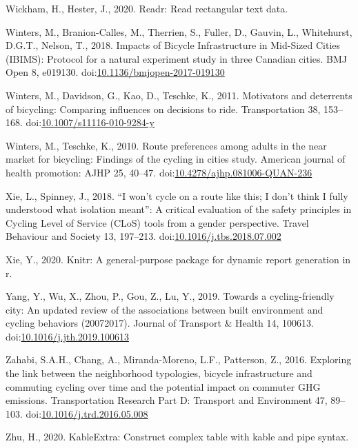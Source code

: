 \documentclass[]{elsarticle} %
\begin{document}
\leavevmode\hypertarget{ref-R-readr}{}%
Wickham, H., Hester, J., 2020. Readr: Read rectangular text data.

\leavevmode\hypertarget{ref-wintersImpactsBicycleInfrastructure2018}{}%
Winters, M., Branion-Calles, M., Therrien, S., Fuller, D., Gauvin, L.,
Whitehurst, D.G.T., Nelson, T., 2018. Impacts of Bicycle Infrastructure
in Mid-Sized Cities (IBIMS): Protocol for a natural experiment study in
three Canadian cities. BMJ Open 8, e019130.
doi:\href{https://doi.org/10.1136/bmjopen-2017-019130}{10.1136/bmjopen-2017-019130}

\leavevmode\hypertarget{ref-wintersMotivatorsDeterrentsBicycling2011}{}%
Winters, M., Davidson, G., Kao, D., Teschke, K., 2011. Motivators and
deterrents of bicycling: Comparing influences on decisions to ride.
Transportation 38, 153--168.
doi:\href{https://doi.org/10.1007/s11116-010-9284-y}{10.1007/s11116-010-9284-y}

\leavevmode\hypertarget{ref-wintersRoutePreferencesAdults2010}{}%
Winters, M., Teschke, K., 2010. Route preferences among adults in the
near market for bicycling: Findings of the cycling in cities study.
American journal of health promotion: AJHP 25, 40--47.
doi:\href{https://doi.org/10.4278/ajhp.081006-QUAN-236}{10.4278/ajhp.081006-QUAN-236}

\leavevmode\hypertarget{ref-xieWonCycleRoute2018}{}%
Xie, L., Spinney, J., 2018. ``I won't cycle on a route like this; I
don't think I fully understood what isolation meant'': A critical
evaluation of the safety principles in Cycling Level of Service (CLoS)
tools from a gender perspective. Travel Behaviour and Society 13,
197--213.
doi:\href{https://doi.org/10.1016/j.tbs.2018.07.002}{10.1016/j.tbs.2018.07.002}

\leavevmode\hypertarget{ref-R-knitr}{}%
Xie, Y., 2020. Knitr: A general-purpose package for dynamic report
generation in r.

\leavevmode\hypertarget{ref-yangCyclingfriendlyCityUpdated2019}{}%
Yang, Y., Wu, X., Zhou, P., Gou, Z., Lu, Y., 2019. Towards a
cycling-friendly city: An updated review of the associations between
built environment and cycling behaviors (20072017). Journal of Transport
\& Health 14, 100613.
doi:\href{https://doi.org/10.1016/j.jth.2019.100613}{10.1016/j.jth.2019.100613}

\leavevmode\hypertarget{ref-zahabiExploringLinkNeighborhood2016b}{}%
Zahabi, S.A.H., Chang, A., Miranda-Moreno, L.F., Patterson, Z., 2016.
Exploring the link between the neighborhood typologies, bicycle
infrastructure and commuting cycling over time and the potential impact
on commuter GHG emissions. Transportation Research Part D: Transport and
Environment 47, 89--103.
doi:\href{https://doi.org/10.1016/j.trd.2016.05.008}{10.1016/j.trd.2016.05.008}

\leavevmode\hypertarget{ref-R-kableExtra}{}%
Zhu, H., 2020. KableExtra: Construct complex table with kable and pipe
syntax.
\end{document}
